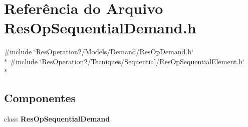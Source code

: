 \section{Referência do Arquivo Res\+Op\+Sequential\+Demand.\+h}
\label{_res_op_sequential_demand_8h}
{\ttfamily \#include \char`\"{}Res\+Operation2/\+Models/\+Demand/\+Res\+Op\+Demand.\+h\char`\"{}}\\*
{\ttfamily \#include \char`\"{}Res\+Operation2/\+Tecniques/\+Sequential/\+Res\+Op\+Sequential\+Element.\+h\char`\"{}}\\*
\subsection*{Componentes}
\begin{DoxyCompactItemize}
\item 
class {\bf Res\+Op\+Sequential\+Demand}
\end{DoxyCompactItemize}
